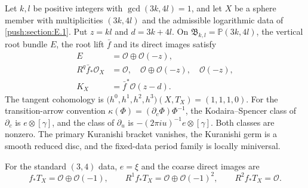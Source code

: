 
\begin{theorem}\hypertarget{tag-032U}{}\label{push:src:E.2.1}
\hypertarget{tag-01RH}{}\label{fam:src:A.5.2}\label{fam:st:A.5.2}\label{inv:D1.3}\label{inv:D2.1}\label{inv:D3.1}\label{cdp:st:E9}
\hypertarget{tag-02YO}{}\label{night:P5.3}\label{stmt:P5.3}
\hypertarget{tag-02YP}{}\label{night:P5.4}\label{stmt:P5.4}

Let $k,l$ be positive integers with $\gcd(3k,4l)=1$, and let $X$
be a sphere member with multiplicities $(3k,4l)$ and the admissible
logarithmic data of \cref{push:section:E.1}. Put $z=kl$ and
$d=3k+4l$. On $\mathfrak B_{k,l}=\mathbb P(3k,4l)$, the vertical
root bundle $E$, the root lift $\bar f$ and its direct images satisfy
\[
 \begin{split}
 E&=\mathcal O\oplus\mathcal O(-z),\\
 R^q\bar f_*\mathcal O_X&=
 \mathcal O,\quad\mathcal O\oplus\mathcal O(-z),\quad\mathcal O(-z),\\
 K_X&=\bar f^*\mathcal O(z-d).
 \end{split}
\]
The tangent cohomology is
$\bigl(h^0,h^1,h^2,h^3\bigr)(X,T_X)=(1,1,1,0)$.
For the transition-arrow convention
$\kappa(\Phi)=(\partial_c\Phi)\Phi^{-1}$, the Kodaira--Spencer
class of $\partial_c$ is $e\otimes[\gamma]$, and the class of
$\partial_u$ is $-(2\pi i u)^{-1}e\otimes[\gamma]$.
Both classes are nonzero. The primary Kuranishi bracket vanishes,
the Kuranishi germ is a smooth reduced disc, and the fixed-data
period family is locally miniversal.

For the standard $(3,4)$ data, $e=\xi$ and the coarse direct
images are
\begin{equation}
 f_*T_X=\mathcal O\oplus\mathcal O(-1),\qquad
 R^1f_*T_X=\mathcal O\oplus\mathcal O(-1)^2,\qquad
 R^2f_*T_X=\mathcal O.
\label{pub:I:eq:D-4}
\end{equation}
\end{theorem}


